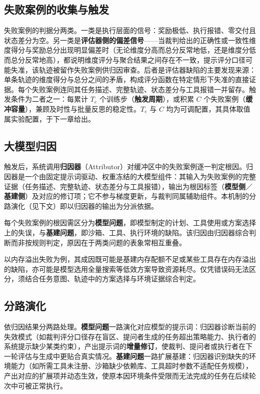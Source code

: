 \subsection{失败案例的收集与触发}

失败案例的判据分两类。一类是执行层面的信号：奖励极低、执行报错、零交付且状态差分为空。另一类是\textbf{评估器侧的偏差信号}——当裁判给出的正确性或一致性维度得分与奖励总分出现明显偏差时（无论维度分高而总分反常地低，还是维度分低而总分反常地高），都说明维度评分与聚合结果之间存在不一致，提示评分口径可能失准，该轨迹被留作失败案例供归因审查。后者是评估器缺陷的主要发现来源：单条轨迹的维度得分与总分之间的矛盾，构成评分函数在特定情形下失准的直接证据。每个失败案例连同其任务描述、完整轨迹、状态差分与工具报错一并留存。触发条件为二者之一：每累计 $T_e$ 个训练步（\textbf{触发周期}），或积累 $C$ 个失败案例（\textbf{缓冲容量}），兼顾及时性与批量反思的稳定性。$T_e$ 与 $C$ 均为可调配置，其具体取值属实验配置，于下一章给出。

\subsection{大模型归因}

触发后，系统调用\textbf{归因器}（Attributor）对缓冲区中的失败案例逐一判定根因。归因器是一个由固定提示词驱动、权重冻结的大模型组件：其输入为失败案例的完整证据（任务描述、完整轨迹、状态差分与工具报错），输出为根因标签（\textbf{模型侧}／\textbf{基建侧}）及对应的修订项；它不参与梯度更新，与裁判同属辅助组件。本机制的分路演化（见下文）即以归因器的输出为分派依据。

每个失败案例的根因需区分为\textbf{模型问题}，即模型制定的计划、工具使用或方案选择上的失误，与\textbf{基建问题}，即沙箱、工具、执行环境的缺陷。该归因由归因器综合判断而非按规则判定，原因在于两类问题的表象常相互重叠。

以内存溢出失败为例，其成因既可能是基建内存配额不足或某些工具存在内存溢出的缺陷，亦可能是模型选用全量搜索等低效方案导致资源耗尽。仅凭错误码无法区分，须结合任务意图、轨迹中的方案选择与环境证据综合判定。

\subsection{分路演化}

依归因结果分两路处理。\textbf{模型问题}一路演化对应模型的提示词：归因器诊断当前的失效模式（如裁判评分口径存在盲区、提问者生成的任务超出策略能力、执行者的系统提示缺少某类约束），产出提示词的\textbf{增量修订}，使裁判、提问者或执行者在下一轮评估与生成中更贴合真实情况。\textbf{基建问题}一路扩展基建：归因器识别缺失的环境能力（如所需工具未注册、沙箱缺少依赖库、工具超时参数不适配任务规模），产出对应的扩展项并动态生效，使原本因环境条件受限而无法完成的任务在后续轮次中可被正常执行。

